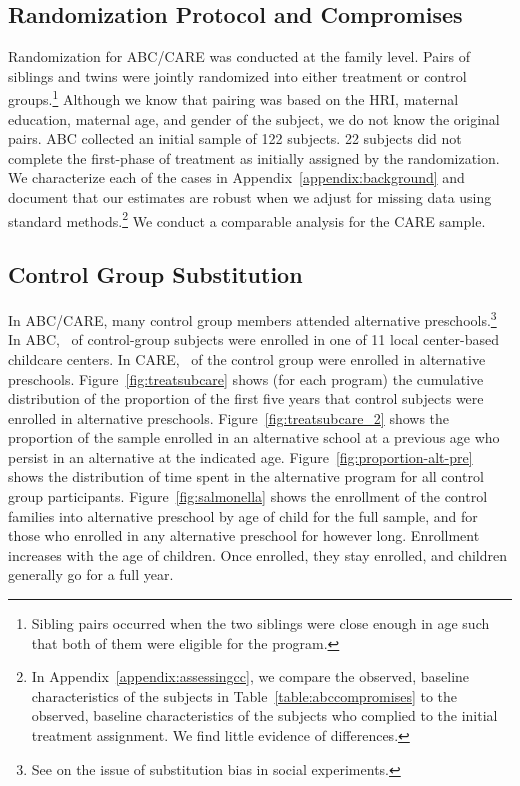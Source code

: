 \subsection{Randomization Protocol and Compromises} \label{section:randomization}

Randomization for ABC/CARE was conducted at the family level. Pairs of siblings and twins were jointly randomized into either treatment or control groups.\footnote{Sibling pairs occurred when the two siblings were close enough in age such that both of them were eligible for the program.} Although we know that pairing was based on the HRI, maternal education, maternal age, and gender of the subject, we do not know the original pairs. ABC collected an initial sample of 122 subjects. 22 subjects did not complete the first-phase of treatment as initially assigned by the randomization. We characterize each of the cases in Appendix~\ref{appendix:background} and document that our estimates are robust when we adjust for missing data using standard methods.\footnote{In Appendix~\ref{appendix:assessingcc}, we compare the observed, baseline characteristics of the subjects in Table~\ref{table:abccompromises} to the observed, baseline characteristics of the subjects who complied to the initial treatment assignment. We find little evidence of differences.} We conduct a comparable analysis for the CARE sample.

\subsection{Control Group Substitution}

In ABC/CARE, many control group members attended alternative preschools.\footnote{See \cite{Heckman_Hohmann_etal_2000_QJE} on the issue of substitution bias in social experiments.} In ABC, \treatsubsabc\ of control-group subjects were enrolled in one of 11 local center-based childcare centers. In CARE, \treatsubscarec\ of the control group were enrolled in alternative preschools. Figure~\ref{fig:treatsubcare} shows (for each program) the cumulative distribution of the proportion of the first five years that control subjects were enrolled in alternative preschools. Figure~\ref{fig:treatsubcare_2} shows the proportion of the sample enrolled in an alternative school at a previous age who persist in an alternative at the indicated age. Figure~\ref{fig:proportion-alt-pre} shows the distribution of time spent in the alternative program for all control group participants. Figure~\ref{fig:salmonella} shows the enrollment of the control families into alternative preschool by age of child for the full sample, and for those who enrolled in any alternative preschool for however long. Enrollment increases with the age of children. Once enrolled, they stay enrolled, and children generally go for a full year.

